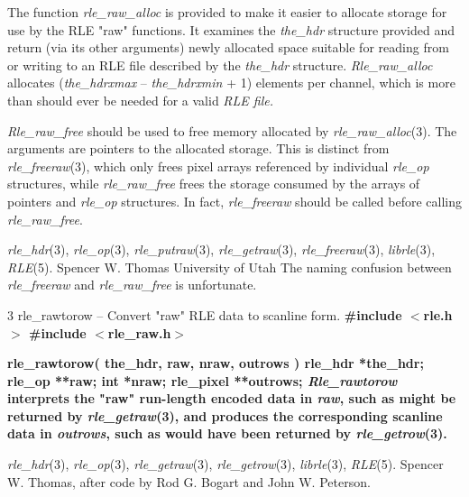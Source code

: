 The function
{\it rle\_raw\_alloc}
is provided to make it easier to allocate storage for use by the RLE
"raw" functions.  It examines the
{\it the\_hdr}
structure provided and return (via its other arguments) newly
allocated space suitable for reading from or writing to an RLE file
described by the
{\it the\_hdr}
structure.
{\it Rle\_raw\_alloc}
allocates
{\rm (}{\it the\_hdr}{\rm }{\it xmax}
--
{\it the\_hdr}{\rm }{\it xmin}
+ 1)
elements per channel, which is more than should ever be needed for a
valid %
\it RLE \rm%
file.

{\it Rle\_raw\_free}
should be used to free memory allocated by 
{\it rle\_raw\_alloc}{\rm (3).}
The arguments are pointers to the allocated storage.
This is distinct from
{\it rle\_freeraw}{\rm (3),}
which only frees pixel arrays referenced by individual
{\it rle\_op}
structures, while
{\it rle\_raw\_free}
frees the storage consumed by the arrays of pointers and
{\it rle\_op}
structures.
In fact, 
{\it rle\_freeraw}
should be called before calling
{\it rle\_raw\_free}{\rm .}
\raggedright
{\it rle\_hdr}{\rm (3),}
{\it rle\_op}{\rm (3),}
{\it rle\_putraw}{\rm (3),}
{\it rle\_getraw}{\rm (3),}
{\it rle\_freeraw}{\rm (3),}
{\it librle}{\rm (3),}
{\it RLE}{\rm (5).}
Spencer W. Thomas
\nwl
University of Utah
The naming confusion between
{\it rle\_freeraw}
and
{\it rle\_raw\_free}
is unfortunate.
\newpage


%
%
%
 3
rle\_rawtorow -- Convert "raw" RLE data to scanline form.
\bf
\#include $<$rle.h$>$
\nwl
\bf
\#include $<$rle\_raw.h$>$
\par\vspace{1.0\baselineskip}
\bf
rle\_rawtorow( the\_hdr, raw, nraw, outrows )
\nwl
{\bf rle\_hdr} *the\_hdr;
\nwl
{\bf rle\_op} **raw;
\nwl
{\bf int} *nraw;
\nwl
{\bf rle\_pixel} **outrows;
{\it Rle\_rawtorow}
interprets the "raw" run-length encoded data in
{\it raw}{\rm ,}
such as might be returned by
{\it rle\_getraw}{\rm (3),}
and produces the corresponding scanline data in
{\it outrows}{\rm ,}
such as would have been returned by
{\it rle\_getrow}{\rm (3).}
\raggedright
{\it rle\_hdr}{\rm (3),}
{\it rle\_op}{\rm (3),}
{\it rle\_getraw}{\rm (3),}
{\it rle\_getrow}{\rm (3),}
{\it librle}{\rm (3),}
{\it RLE}{\rm (5).}
Spencer W. Thomas, after code by Rod G. Bogart and John W. Peterson.
\newpage


